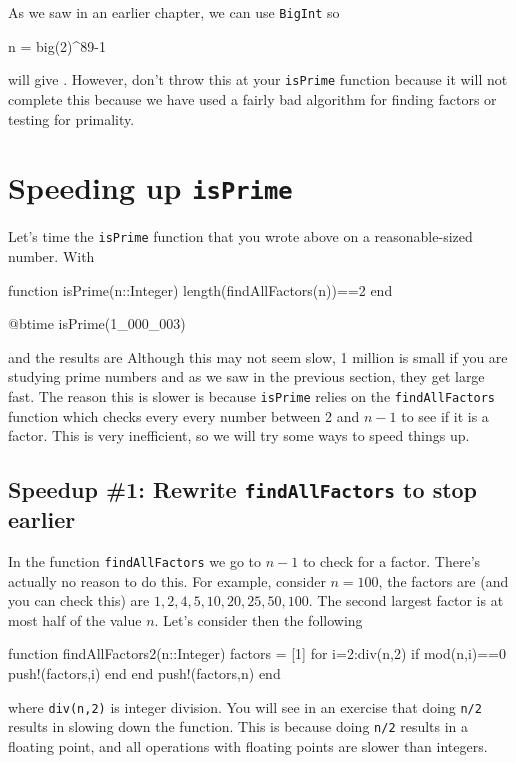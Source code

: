 As we saw in an earlier chapter, we can use \texttt{BigInt} so

\begin{jlblock}[nt]
n = big(2)^89-1
\end{jlblock}

will give  \printpythontex[verb]. However, don't throw
this at your \texttt{isPrime} function because it will not complete
this because we have used a fairly bad algorithm for finding factors or
testing for primality.


\section{\texorpdfstring{Speeding up \texttt{isPrime}}{Speeding up is\_prime}}

Let's time the \texttt{isPrime} function that you wrote above on a reasonable-sized number. With
\begin{jlcode}[nt]
function isPrime(n::Integer)
  length(findAllFactors(n))==2
end
\end{jlcode}
\begin{jlblock}[nt]
@btime isPrime(1_000_003)
\end{jlblock}
and the results are  \printpythontex[verbatim]
%
Although this may not seem slow, 1 million is small if you are studying prime numbers and as we saw in the previous section, they get large fast.   The reason this is slower is because \texttt{isPrime} relies on the \texttt{findAllFactors} function which checks every every number between 2 and $n-1$ to see if it is a factor. This is very inefficient, so we will try some ways to speed things up.


\subsection{Speedup \#1: Rewrite \texttt{findAllFactors} to stop earlier}

In the function \texttt{findAllFactors} we go to $n-1$ to check for a factor.  There's actually no reason to do this.  For example, consider $n=100$, the factors are (and you can check this) are $1,2,4,5,10,20,25,50,100$.  The second largest factor is at most half of the value $n$.  Let's consider then the following

\begin{jlblock}[nt]
function findAllFactors2(n::Integer)
  factors = [1]
  for i=2:div(n,2)
    if mod(n,i)==0
      push!(factors,i)
    end
  end
  push!(factors,n)
end
\end{jlblock}
where \texttt{div(n,2)} is integer division.  You will see in an exercise that doing \texttt{n/2} results in slowing down the function.  This is because doing \verb!n/2! results in a floating point, and all operations with floating points are slower than integers.  

